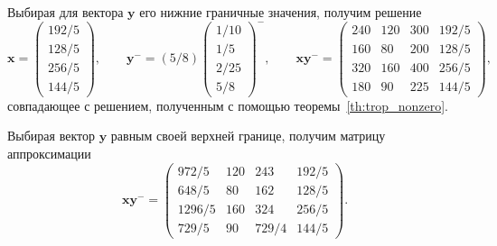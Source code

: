 \documentclass[specialist,
               substylefile = spbu.rtx,
               subf,href,colorlinks=true, 12pt]{disser}
\theoremstyle{definition}
\begin{document}
Выбирая для вектора $\bm{y}$ его нижние граничные значения, получим решение
\begin{equation*}
\bm{x}
=
\begin{pmatrix}
192/5\\128/5\\256/5\\144/5
\end{pmatrix},
\qquad
\bm{y}^{-}
=
(5/8)
\begin{pmatrix}
1/10\\1/5\\2/25\\5/8
\end{pmatrix}^{-},
\qquad
\bm{x}\bm{y}^{-}
=
\begin{pmatrix}
240 &120 &300 &192/5\\
160 &80 &200 &128/5\\
320 &160 &400 &256/5\\
180 &90 &225 &144/5
\end{pmatrix},
\end{equation*}
 совпадающее с решением, полученным с помощью теоремы~\ref{th:trop_nonzero}.
 
Выбирая вектор $\bm{y}$ равным своей верхней границе, получим матрицу аппроксимации 
\begin{equation*}
\bm{x}\bm{y}^{-}
=
\begin{pmatrix}
972/5 &120 &243 &192/5\\
648/5 &80 &162 &128/5\\
1296/5 &160 &324 &256/5\\
729/5 &90 &729/4 &144/5
\end{pmatrix}.
\end{equation*}
\end{document}
